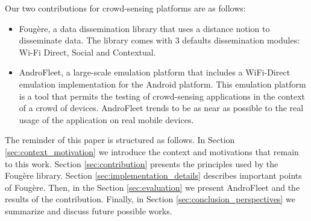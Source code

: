 

Our two contributions for crowd-sensing platforms are as follows:
\begin{itemize}
	\item Foug\`ere, a data dissemination library that uses a distance notion to disseminate data.
	The library comes with 3 defaults dissemination modules: Wi-Fi Direct, Social and Contextual.
	\item AndroFleet, a large-scale emulation platform that includes a WiFi-Direct emulation implementation for the Android platform. 
	This emulation platform is a tool that permits the testing of crowd-sensing applications in the context of a crowd of devices. 
	AndroFleet trends to be as near as possible to the real usage of the application on real mobile devices.
\end{itemize}

The reminder of this paper is structured as follows. In Section \ref{sec:context_motivation} we introduce the context and motivations that remain to this work. Section \ref{sec:contribution} presents the principles used by the Foug\`ere library. Section \ref{sec:implementation_details} describes important points of Foug\`ere. Then, in the Section \ref{sec:evaluation} we present AndroFleet and the results of the contribution. Finally, in Section \ref{sec:conclusion_perspectives} we summarize and discuss future possible works.

